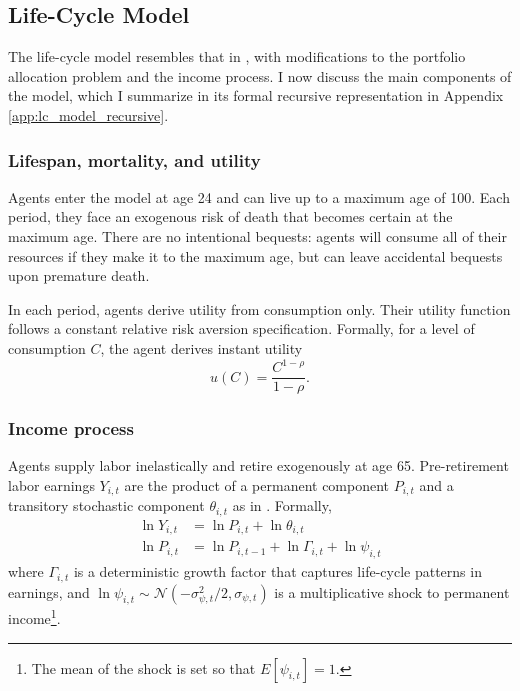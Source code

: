 \documentclass[./RiskyContrib.tex]{subfiles}
\begin{document}
\subsection{Life-Cycle Model}\label{sec:mod_lc}

The life-cycle model resembles that in \cite{Cocco2005rfs}, with modifications
to the portfolio allocation problem and the income process. I now discuss the main
components of the model, which I summarize in its formal recursive representation
in Appendix \ref{app:lc_model_recursive}.

\subsubsection{Lifespan, mortality, and utility}

Agents enter the model at age 24 and can live up to a maximum age of 100.
Each  period, they face an exogenous risk of death that becomes certain at the 
maximum age. There are no intentional bequests: agents will consume all of their 
resources if they make it to the maximum age, but can leave accidental 
bequests upon premature death.

In each period, agents derive utility from consumption only. 
Their utility function follows a constant relative risk aversion 
specification. Formally, for a level of 
consumption $C$, the agent derives instant utility
\begin{equation}
	u(C) = \frac{C^{1-\rho}}{1- \rho}.
\end{equation}

\subsubsection{Income process}

Agents supply labor inelastically and retire exogenously at age 
65. Pre-retirement labor earnings $Y_{i,t}$ are the product of a permanent
component $P_{i,t}$ and a transitory stochastic component $\theta_{i,t}$ as
in \cite{Carroll1997qje}. Formally,
\begin{equation*}
\begin{split}
\ln Y_{i,t} &= \ln P_{i,t} + \ln \theta_{i,t} \\
\ln P_{i,t} &= \ln P_{i,t-1} + \ln \Gamma_{i,t} + \ln \psi_{i,t}
\end{split}
\end{equation*}
where $\Gamma_{i,t}$ is a deterministic growth factor that captures
life-cycle patterns in earnings, and
$\ln \psi_{i,t}\sim \mathcal{N}(-\sigma^2_{\psi,t}/2, \sigma_{\psi,t})$
is a multiplicative shock to permanent income\footnote{The mean of the shock is set so that $E[\psi_{i,t}] = 1$.}.
\end{document}
